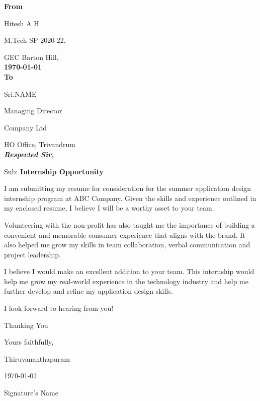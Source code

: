 \documentclass[12pt,a4paper,twoside,openright,titlepage]{book}
\author{}
\date{}
\providecommand{\tightlist}{%
  \setlength{\itemsep}{0pt}\setlength{\parskip}{0pt}}
\begin{document}
\textbf{From}

Hitesh A H

M.Tech SP 2020-22,

GEC Barton Hill,
\vspace{5mm}\\
\textbf{\today}
\vspace{5mm}\\
\textbf{To}

Sri.NAME

Managing Director

Company Ltd

HO Office, Trivandrum
\vspace{5mm}\\
\textbf{\textit{Respected Sir,}}

Sub: \textbf{Internship Opportunity}

  
  
  

\par I am submitting my resume for consideration for the summer application design internship program at ABC Company. Given the skills and experience outlined in my enclosed resume, I believe I will be a worthy asset to your team.
\par Volunteering with the non-profit has also taught me the importance of building a convenient and memorable consumer experience that aligns with the brand. It also helped me grow my skills in team collaboration, verbal communication and project leadership.
\par I believe I would make an excellent addition to your team. This internship would help me grow my real-world experience in the technology industry and help me further develop and refine my application design skills.
\par I look forward to hearing from you!

Thanking You

\hfill Yours faithfully,

Thiruvananthapuram

\today
\null

\hfill Signature's Name

\end{document}
